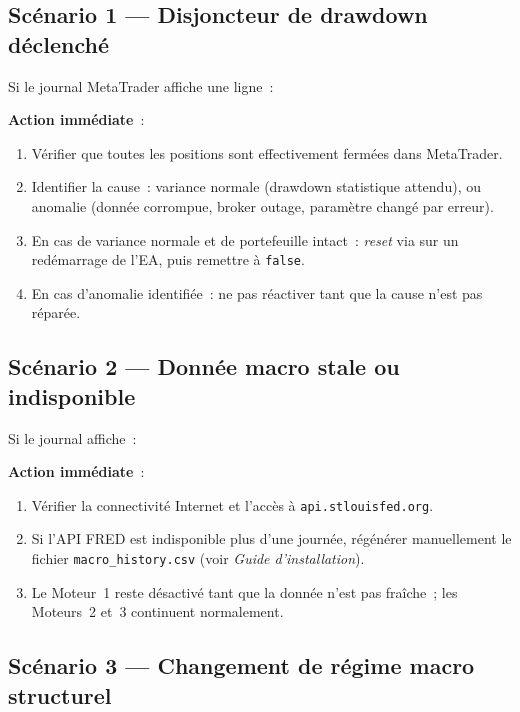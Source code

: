 \documentclass[11pt, a4paper]{scrartcl}
\begin{document}
\subsection{Scénario 1 --- Disjoncteur de drawdown déclenché}

Si le journal MetaTrader affiche une ligne~:
\begin{quote}\end{quote}

\textbf{Action immédiate}~:
\begin{enumerate}
\item Vérifier que toutes les positions sont effectivement fermées dans MetaTrader.
\item Identifier la cause~: variance normale (drawdown statistique attendu), ou anomalie (donnée corrompue, broker outage, paramètre changé par erreur).
\item En cas de variance normale et de portefeuille intact~: \emph{reset} via  sur un redémarrage de l'EA, puis remettre à \texttt{false}.
\item En cas d'anomalie identifiée~: ne pas réactiver tant que la cause n'est pas réparée.
\end{enumerate}

\subsection{Scénario 2 --- Donnée macro stale ou indisponible}

Si le journal affiche~:
\begin{quote}\end{quote}

\textbf{Action immédiate}~:
\begin{enumerate}
\item Vérifier la connectivité Internet et l'accès à \texttt{api.stlouisfed.org}.
\item Si l'API FRED est indisponible plus d'une journée, régénérer manuellement le fichier \texttt{macro\_history.csv} (voir \emph{Guide d'installation}).
\item Le Moteur~1 reste désactivé tant que la donnée n'est pas fraîche~; les Moteurs~2 et~3 continuent normalement.
\end{enumerate}

\subsection{Scénario 3 --- Changement de régime macro structurel}
\end{document}
